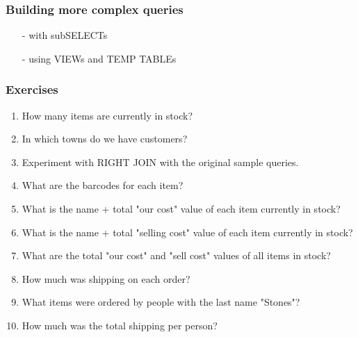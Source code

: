 \documentclass[20pt]{beamer}
\begin{document}
\frame
{
    \frametitle{Building more complex queries}
    \begin{itemize}
    \item[-] with subSELECTs
    \item[-] using VIEWs and TEMP TABLEs
    \end{itemize}
}




\frame
{
    \frametitle{Exercises}
    \begin{enumerate}
    \small
    \item How many items are currently in stock?
    \item In which towns do we have customers?
    \item Experiment with RIGHT JOIN with the original sample queries.
    \item What are the barcodes for each item?
    \item What is the name + total "our cost" value of each item currently in stock?
    \item What is the name + total "selling cost" value of each item currently in stock?
    \item What are the total "our cost" and "sell cost" values of all items in stock?
    \item How much was shipping on each order?
    \item What items were ordered by people with the last name "Stones"?
    \item How much was the total shipping per person?
    \end{enumerate}
}
\end{document}

